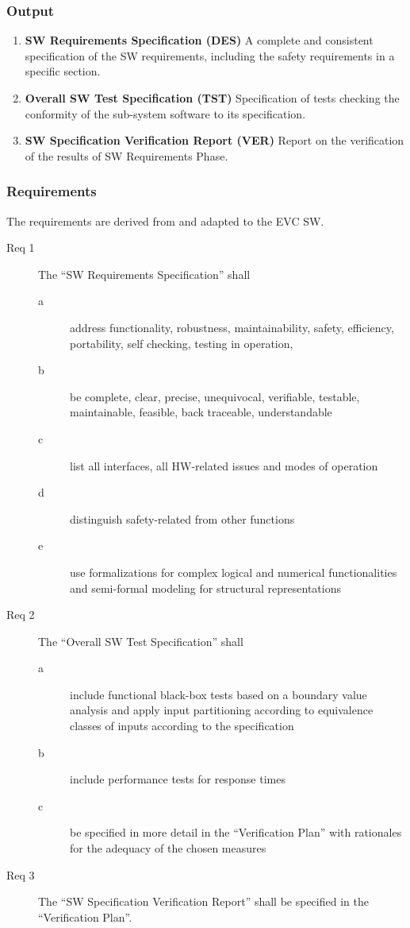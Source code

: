 \documentclass{template/openetcs_article}
\begin{document}
\subsubsection{Output}
\label{sec:3-output}

\begin{enumerate}
\item \textbf{SW Requirements Specification (DES)} A complete and consistent
  specification of the SW requirements, including the safety
  requirements in a specific section. 
\item \textbf{Overall SW Test Specification (TST)} Specification of tests
  checking the conformity of the sub-system software to its specification. 
\item \textbf{SW Specification Verification Report (VER)} Report on the
  verification of the results of SW Requirements Phase.
\end{enumerate}

\subsubsection{Requirements}
\label{sec:3-requirements}


The requirements are derived from \cite[Sec.~7.2.4]{EN50128:2011}
and adapted to the EVC SW.
\begin{description}
\item[Req 1] The ``SW Requirements Specification'' shall 
  \begin{description}
  \item[a] address functionality, robustness, maintainability, safety,
    efficiency, portability, self checking, testing in operation, 
  \item[b] be complete, clear, precise, unequivocal, verifiable,
    testable, maintainable, feasible, back traceable, understandable
  \item[c] list all interfaces, all HW-related issues and modes of
    operation 
  \item[d] distinguish safety-related from other functions
  \item[e] use formalizations for complex logical and numerical
    functionalities and semi-formal modeling for structural representations  
  \end{description}
\item[Req 2] The ``Overall SW Test Specification'' shall
  \begin{description}
  \item[a] include functional black-box tests based on a boundary value
    analysis and apply input partitioning according to equivalence
    classes of inputs according to the specification
  \item[b] include performance tests for response times
  \item[c] be specified in more detail in the ``Verification Plan''
    with rationales for the adequacy of the chosen measures
  \end{description}
\item[Req 3] The ``SW Specification Verification Report'' shall be
  specified in the ``Verification Plan''.
\end{description}
\end{document}
